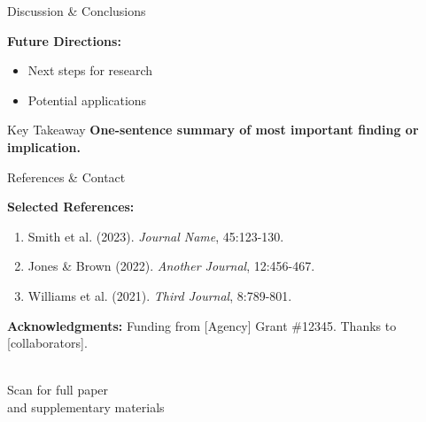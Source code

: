 \documentclass[final]{beamer}
\begin{document}
\begin{frame}[t]
\begin{columns}[t]
\begin{column}{.48\textwidth}
\begin{block}{Discussion \& Conclusions}
\vspace{0.5cm}

\textbf{Future Directions:}
\begin{itemize}
    \item Next steps for research
    \item Potential applications
\end{itemize}

\vspace{0.5cm}

\begin{alertblock}{Key Takeaway}
\textbf{One-sentence summary of most important finding or implication.}
\end{alertblock}

\end{block}

\vspace{1cm}

\begin{block}{References \& Contact}

\begin{minipage}[t]{0.65\textwidth}
\small
\textbf{Selected References:}
\begin{enumerate}
    \item Smith et al. (2023). \textit{Journal Name}, 45:123-130.
    \item Jones \& Brown (2022). \textit{Another Journal}, 12:456-467.
    \item Williams et al. (2021). \textit{Third Journal}, 8:789-801.
\end{enumerate}

\vspace{0.3cm}

\textbf{Acknowledgments:} Funding from [Agency] Grant \#12345. Thanks to [collaborators].
\end{minipage}
\hfill
\begin{minipage}[t]{0.3\textwidth}
\begin{center}
\\
\small Scan for full paper\\and supplementary materials
\end{center}
\end{minipage}

\end{block}

\end{column}

\end{columns}
\end{frame}
\end{document}
